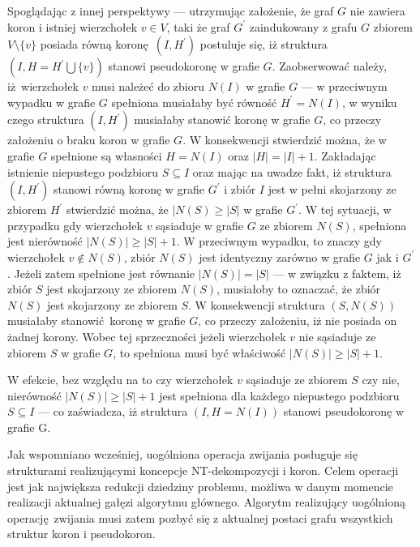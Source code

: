 {\begin{bproof}
    Spoglądając z innej perspektywy --- utrzymując założenie, że graf $G$ nie zawiera koron i istniej wierzchołek $v \in V$, taki że graf $G^\prime$ zaindukowany z grafu $G$ zbiorem $V \setminus \{v\}$ posiada równą koronę $(I, H^\prime)$ postuluje się, iż struktura $(I, H=H^\prime \bigcup\{v\})$ stanowi pseudokoronę w grafie $G$.
    Zaobserwować należy, iż wierzchołek $v$ musi należeć do zbioru $N(I)$ w grafie $G$ --- w przeciwnym wypadku w grafie $G$ spełniona musiałaby być równość $H^\prime=N(I)$, w wyniku czego struktura $(I, H^\prime)$ musiałaby stanowić koronę w grafie $G$, co przeczy założeniu o braku koron w grafie $G$.
    W konsekwencji stwierdzić można, że w grafie $G$ spełnione są własności $H=N(I)$ oraz $|H|=|I|+1$.
    Zakładając istnienie niepustego podzbioru $S \subseteq I$ oraz mając na uwadze fakt, iż struktura $(I, H^\prime)$ stanowi równą koronę w grafie $G^\prime$ i zbiór $I$ jest w pełni skojarzony ze zbiorem $H^\prime$ stwierdzić można, że $|N(S) \geq |S|$ w grafie $G^\prime$.
    W tej sytuacji, w przypadku gdy wierzchołek $v$ sąsiaduje w grafie $G$ ze zbiorem $N(S)$, spełniona jest nierówność $|N(S)| \geq |S| + 1$.
    W przeciwnym wypadku, to znaczy gdy wierzchołek $v \notin N(S)$, zbiór $N(S)$ jest identyczny zarówno w grafie $G$ jak i $G^\prime$.
    Jeżeli zatem spełnione jest równanie $|N(S)|=|S|$ --- w związku z faktem, iż zbiór $S$ jest skojarzony ze zbiorem $N(S)$, musiałoby to oznaczać, że zbiór $N(S)$ jest skojarzony ze zbiorem $S$.
    W konsekwencji struktura $(S, N(S))$ musiałaby stanowić koronę w grafie $G$, co przeczy założeniu, iż nie posiada on żadnej korony.
    Wobec tej sprzeczności jeżeli wierzchołek $v$ nie sąsiaduje ze zbiorem $S$ w grafie $G$, to spełniona musi być właściwość $|N(S)| \geq |S| + 1$.

    W efekcie, bez względu na to czy wierzchołek $v$ sąsiaduje ze zbiorem $S$ czy nie, nierówność $|N(S)| \geq |S| + 1$ jest spełniona dla każdego niepustego podzbioru $S \subseteq I$ --- co zaświadcza, iż struktura $(I, H=N(I))$ stanowi pseudokoronę w grafie G.
  \end{bproof}

  Jak wspomniano wcześniej, uogólniona operacja zwijania posługuje się strukturami realizującymi koncepcje NT-dekompozycji i koron.
  Celem operacji jest jak największa redukcji dziedziny problemu, możliwa w danym momencie realizacji aktualnej gałęzi algorytmu głównego.
  Algorytm realizujący uogólnioną operację zwijania musi zatem pozbyć się z aktualnej postaci grafu wszystkich struktur koron i pseudokoron.

}

